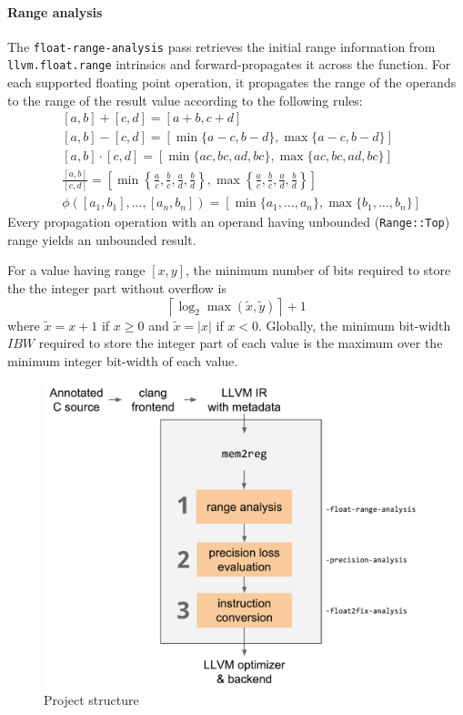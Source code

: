 \documentclass[9pt,twocolumn,a4paper]{scrartcl}
\begin{document}
\paragraph{Range analysis} The \verb|float-range-analysis| pass retrieves the
initial range information from \verb|llvm.float.range| intrinsics and
forward-propagates it across the function.
For each supported floating point operation, it propagates the range of the
operands to the range of the result value according to the following rules:
\begin{align*}
&[a, b] + [c, d] = \left[a + b, c + d\right] \\
&[a, b] - [c, d] = \left[\min\{a - c, b - d\}, \max\{a - c, b - d\}\right] \\
&[a, b] \cdot [c, d] = \left[\min\{ac, bc, ad, bc\}, \max\{ac, bc, ad, bc\}\right] \\
&\frac{[a, b]}{[c, d]} = \left[\min\left\{\frac{a}{c}, \frac{b}{c}, \frac{a}{d}, \frac{b}{d}\right\},
                               \max\left\{\frac{a}{c}, \frac{b}{c}, \frac{a}{d}, \frac{b}{d}\right\}\right] \\
&\phi([a_1, b_1], \dots,  [a_n, b_n]) = \left[\min\{a_1, \dots, a_n\}, \max\{b_1, \dots, b_n\}\right]
\end{align*}
Every propagation operation with an operand having unbounded
(\verb|Range::Top|) range yields an unbounded result.

For a value having range $[x, y]$, the minimum number of bits required to store
the the integer part without overflow is
    \[ \left \lceil \log_2{\max(\tilde{x}, \tilde{y})} \right \rceil + 1\]
where $\tilde{x} = x + 1$ if $x \geq 0$ and $\tilde{x} = |x|$ if $x < 0$.
Globally, the minimum bit-width $IBW$ required to store the integer part of
each value is the maximum over the minimum integer bit-width of each value.

\begin{figure}
\includegraphics[width=\linewidth]{schema}
\caption{Project structure}\label{fig:project}
\end{figure}
\end{document}
